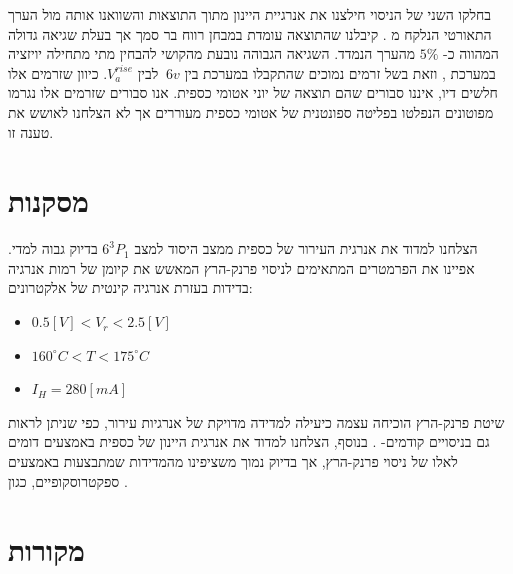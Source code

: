 \documentclass{article}
\begin{document}
בחלקו השני של הניסוי חילצנו את אנרגיית היינון מתוך התוצאות והשוואנו אותה מול הערך התאורטי הנלקח מ
\cite{NIST_ASD}.
קיבלנו שהתוצאה עומדת במבחן רווח בר סמך אך בעלת שגיאה גדולה המהווה 
כ-
$5\%$
מהערך הנמדד.
השגיאה הגבוהה נובעת מהקושי להבחין מתי מתחילה יויזציה במערכת , וזאת בשל
 זרמים נמוכים שהתקבלו במערכת
בין 
$~ 6v$
לבין
$V_a^{rise}$.
כיוון שזרמים אלו חלשים דיו, איננו סבורים שהם תוצאה של יוני אטומי כספית. אנו סבורים שזרמים אלו נגרמו מפוטונים הנפלטו בפליטה ספונטנית של אטומי כספית מעוררים אך לא הצלחנו לאושש את טענה זו.

\section{מסקנות}

הצלחנו למדוד את אנרגית העירור של כספית ממצב היסוד למצב 
$6^3P_1$
בדיוק גבוה למדי. אפיינו את הפרמטרים המתאימים לניסוי פרנק-הרץ המאשש את קיומן של רמות אנרגיה בדידות בעזרת אנרגיה קינטית של אלקטרונים:

\begin{english}
\begin{itemize}
\item $0.5 [V] < V_r < 2.5 [V]$
\item $160^{\circ}C < T < 175^{\circ}C$
\item $I_H = 280 [mA]$
\end{itemize}
\end{english}

שיטת פרנק-הרץ הוכיחה עצמה כיעילה למדידה מדויקת של אנרגיות עירור, כפי שניתן לראות גם בניסויים קודמים-
\cite{MercurySpectrum}.
בנוסף, הצלחנו למדוד את אנרגית היינון של כספית באמצעים דומים לאלו של ניסוי פרנק-הרץ, אך בדיוק נמוך משציפינו מהמדידות שמתבצעות באמצעים ספקטרוסקופיים, כגון
\cite{Zia_2003}.

\section{מקורות}

\begin{english}
\printbibliography[heading=none]
\end{english}
\end{document}
